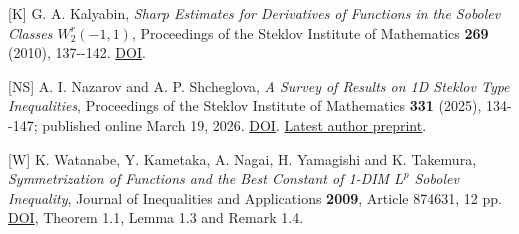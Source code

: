 \documentclass[11pt]{article}
\begin{document}
{[}K{]} G. A. Kalyabin, \emph{Sharp Estimates for Derivatives of
Functions in the Sobolev Classes \(W_2^r(-1,1)\)}, Proceedings of the
Steklov Institute of Mathematics \textbf{269} (2010), 137-\/-142.
\href{https://doi.org/10.1134/S0081543810020112}{DOI}.

{[}NS{]} A. I. Nazarov and A. P. Shcheglova, \emph{A Survey of Results
on 1D Steklov Type Inequalities}, Proceedings of the Steklov Institute
of Mathematics \textbf{331} (2025), 134-\/-147; published online March
19, 2026. \href{https://doi.org/10.1134/S0081543825601509}{DOI}.
\href{https://arxiv.org/abs/2101.10752}{Latest author preprint}.

{[}W{]} K. Watanabe, Y. Kametaka, A. Nagai, H. Yamagishi and K.
Takemura, \emph{Symmetrization of Functions and the Best Constant of
1-DIM \(L^p\) Sobolev Inequality}, Journal of Inequalities and
Applications \textbf{2009}, Article 874631, 12 pp.
\href{https://doi.org/10.1155/2009/874631}{DOI}, Theorem 1.1, Lemma 1.3
and Remark 1.4.
\end{document}
